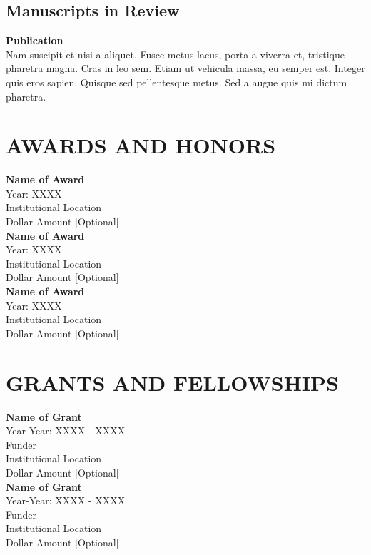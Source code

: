 \documentclass[a4paper,9pt]{extarticle}
\begin{document}
\subsection*{Manuscripts in Review}
\textbf{Publication} \\ 
Nam suscipit et nisi a aliquet. Fusce metus lacus, porta a viverra et, tristique pharetra magna. Cras in leo sem. Etiam ut vehicula massa, eu semper est. Integer quis eros sapien. Quisque sed pellentesque metus. Sed a augue quis mi dictum pharetra. 


\section*{AWARDS AND HONORS}

\noindent
\newline
\textbf{Name of Award} \\
Year: XXXX \\
Institutional Location \\
Dollar Amount [Optional]  \\

\noindent
\textbf{Name of Award} \\
Year: XXXX \\
Institutional Location \\
Dollar Amount [Optional]  \\

\noindent
\textbf{Name of Award} \\
Year: XXXX \\
Institutional Location \\
Dollar Amount [Optional]  


\section*{GRANTS AND FELLOWSHIPS}

\noindent
\newline 
\textbf{Name of Grant} \\
Year-Year: XXXX - XXXX\\
Funder \\
Institutional Location \\
Dollar Amount [Optional]  \\

\noindent
\textbf{Name of Grant} \\ 
Year-Year: XXXX - XXXX\\
Funder \\
Institutional Location \\
Dollar Amount [Optional]  \\
\end{document}
